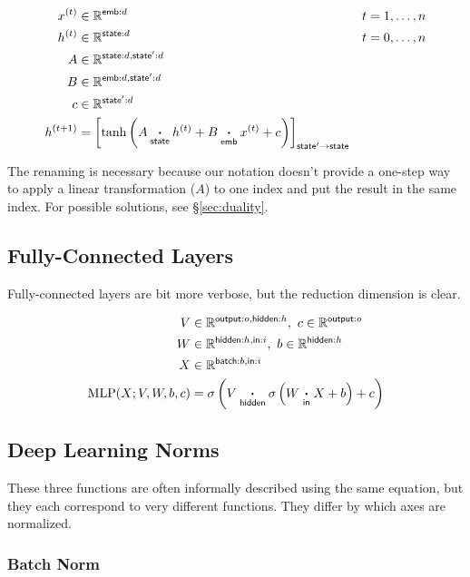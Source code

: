 \documentclass{article}
\newcommand{\name}[1]{\mathsf{#1}}
\newcommand{\ndot}[1]{\mathbin{\mathop{\thinspace\boldsymbol\cdot\thinspace}\displaylimits_{\name{#1}}}}
\newcommand{\reals}{\mathbb{R}}
\begin{document}
\begin{align*}
x^{(t)} &\in \mathbb{R}^{\name{emb}: d} & t &= 1, \ldots, n \\
h^{(t)} &\in \mathbb{R}^{\name{state}: d} & t &= 0, \ldots, n\\
A &\in \mathbb{R}^{\name{state}: d, \name{state'}: d} \\
B &\in \mathbb{R}^{\name{emb}: d, \name{state'}: d} \\
c &\in \mathbb{R}^{\name{state'}: d} \\
h^{(t+1)} &= \left[ \tanh\left( A \ndot{state} h^{(t)} + B \ndot{emb} x^{(t)} + c \right) \right]_{\name{state'} \rightarrow \name{state}}
\end{align*}

The renaming is necessary because our notation doesn't provide a one-step way to apply a linear transformation ($A$) to one index and put the result in the same index. For possible solutions, see \S\ref{sec:duality}.

\subsection{Fully-Connected Layers}

Fully-connected layers are bit more verbose, but the reduction dimension is clear.

\begin{align*} 
V &\in \reals^{\name{output}:o, \name{hidden}:h},\ c\in \reals^{\name{output}:o} \\
W &\in \reals^{{\name{hidden}:h, \name{in}:i}}, \ b \in \reals^{\name{hidden}:h} \\
X &\in \reals^{{\name{batch}:b, \name{in}:i}} \\
\text{MLP}(X; V, W,b, c) &= \sigma \left( V \ndot{hidden} \sigma \left( W \ndot{in} X + b \right) + c \right)  
\end{align*}

\subsection{Deep Learning Norms}



These three functions are often informally described using the same
equation, but they each correspond to very different functions. They differ
by which axes are normalized.

\subsubsection*{Batch Norm}
\end{document}
